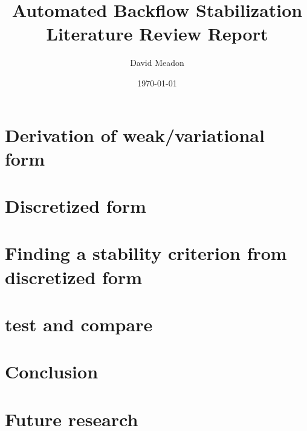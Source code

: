 \documentclass[a4paper]{article}
\title{Automated Backflow Stabilization\\
{\small Literature Review Report}}
\author{David Meadon}
\date{\today}
\begin{document}

\begin{abstract}
    
\end{abstract}


\tableofcontents



\section{Derivation of weak/variational form}

\section{Discretized form}

\section{Finding a stability criterion from discretized form}

\section{test and compare}

\section{Conclusion}

\section{Future research}
\end{document}

